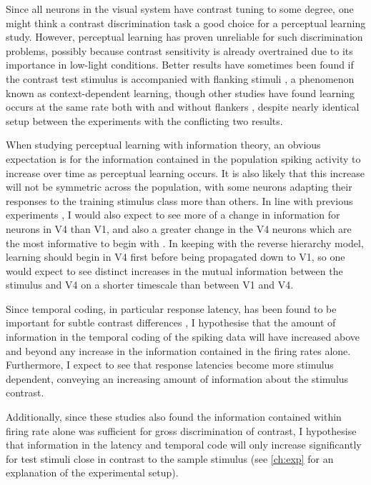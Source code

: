 
Since all neurons in the visual system have contrast tuning to some degree, one might think a contrast discrimination task a good choice for a perceptual learning study.
However, perceptual learning has proven unreliable for such discrimination problems, possibly because contrast sensitivity is already overtrained due to its importance in low-light conditions.
Better results have sometimes been found if the contrast test stimulus is accompanied with flanking stimuli \citep{Adini2002}, a phenomenon known as context-dependent learning, though other studies have found learning occurs at the same rate both with and without flankers \citep{Yu2004}, despite nearly identical setup between the experiments with the conflicting two results.


When studying perceptual learning with information theory, an obvious expectation is for the information contained in the population spiking activity to increase over time as perceptual learning occurs.
It is also likely that this increase will not be symmetric across the population, with some neurons adapting their responses to the training stimulus class more than others.
In line with previous experiments \citep{Raiguel2006}, I would also expect to see more of a change in information for neurons in \ac{V4} than \ac{V1}, and also a greater change in the \ac{V4} neurons which are the most informative to begin with \citep{Raiguel2006}.
In keeping with the reverse hierarchy model, learning should begin in \ac{V4} first before being propagated down to \ac{V1}, so one would expect to see distinct increases in the mutual information between the stimulus and \ac{V4} on a shorter timescale than between \ac{V1} and \ac{V4}.

Since temporal coding, in particular response latency, has been found to be important for subtle contrast differences \citep{Reich2001,Arabzadeh2006}, I hypothesise that the amount of information in the temporal coding of the spiking data will have increased above and beyond any increase in the information contained in the firing rates alone.
Furthermore, I expect to see that response latencies become more stimulus dependent, conveying an increasing amount of information about the stimulus contrast.

Additionally, since these studies \citep{Reich2001,Arabzadeh2006} also found the information contained within firing rate alone was sufficient for gross discrimination of contrast, I hypothesise that information in the latency and temporal code will only increase significantly for test stimuli close in contrast to the sample stimulus (see \autoref{ch:exp} for an explanation of the experimental setup).

